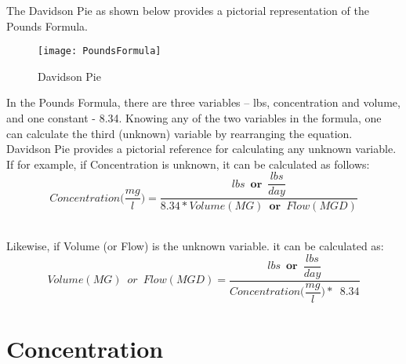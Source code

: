 The Davidson Pie as shown below provides a pictorial representation of the Pounds Formula.

	\begin{figure}[H]
\begin{center}
\texttt{[image: PoundsFormula]}
\end{center}
\caption{Davidson Pie}
\end{figure}

In the Pounds Formula, there are three variables – lbs, concentration and volume, and one constant - 8.34.  Knowing any of the two variables in the formula, one can calculate the third (unknown) variable by rearranging the equation.\\

\vspace{0.3cm}
Davidson Pie provides a pictorial reference for calculating any unknown variable.  If for example, if Concentration is unknown, it can be calculated as follows: \\$$Concentration\Big(\frac{mg}{l}\Big)=\dfrac{lbs \enspace \textbf{or} \enspace \dfrac{lbs}{day}}{8.34*Volume(MG) \enspace \textbf{or} \enspace Flow (MGD)}$$\\

\vspace{0.3cm}

Likewise, if Volume (or Flow) is the unknown variable. it can be calculated as:  \\$$Volume (MG) \enspace or \enspace Flow(MGD)=\dfrac{lbs \enspace \textbf{or} \enspace \dfrac{lbs}{day}}{Concentration\Big(\dfrac{mg}{l}\Big)* \enspace 8.34  }$$
\newpage
\section{Concentration}

